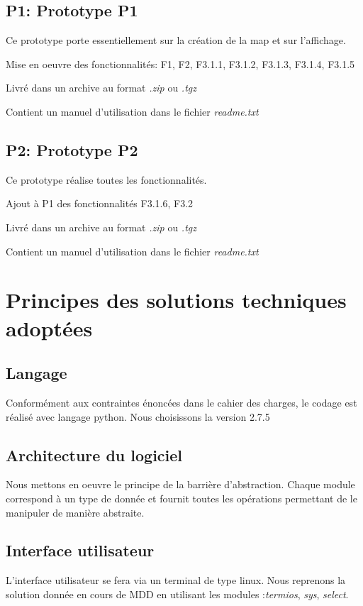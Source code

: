 \documentclass[a4paper]{article}
\begin{document}
        \subsection{P1: Prototype P1}
        Ce prototype porte essentiellement sur la création de la map et sur l'affichage.
        
        Mise en oeuvre des fonctionnalités: F1, F2, F3.1.1, F3.1.2, F3.1.3, F3.1.4, F3.1.5
        
        Livré dans un archive au format \emph{.zip} ou \emph{.tgz}
        
        Contient un manuel d'utilisation dans le fichier \emph{readme.txt}
        \subsection{P2: Prototype P2}
        Ce prototype réalise toutes les fonctionnalités.
        
        Ajout à P1 des fonctionnalités F3.1.6, F3.2
        
        Livré dans un archive au format \emph{.zip} ou \emph{.tgz}
        
        Contient un manuel d'utilisation dans le fichier \emph{readme.txt}
        \newpage
        
    \section{Principes des solutions techniques adoptées}
        \subsection{Langage}
        Conformément aux contraintes énoncées dans le cahier des charges, le codage est réalisé
        avec langage python. Nous choisissons la version 2.7.5

        \subsection{Architecture du logiciel}
        Nous mettons en oeuvre le principe de la barrière d'abstraction. Chaque module correspond
        à un type de donnée et fournit toutes les opérations permettant de le manipuler de manière
        abstraite.

        \subsection{Interface utilisateur}
        L'interface utilisateur se fera via un terminal de type linux. Nous reprenons la solution donnée en cours de MDD en utilisant les modules :\emph{termios}, \emph{sys}, \emph{select}.
\end{document}
